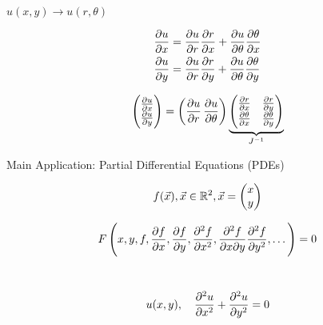 \documentclass[10pt]{scrartcl}
\begin{document}
\begin{example}
	$u(x,y) \longrightarrow u(r,\theta)$
	
	\[
\begin{aligned}
  \frac{\partial u}{\partial x} &= \frac{\partial u}{\partial r}\frac{\partial r}{\partial x} + \frac{\partial u}{\partial \theta} \frac{\partial \theta}{\partial x}\\
  \frac{\partial u}{\partial y} &= \frac{\partial u}{\partial r}\frac{\partial r}{\partial y} + \frac{\partial u}{\partial \theta} \frac{\partial \theta}{\partial y}
\end{aligned}
\]

\[\begin{pmatrix}
\frac{\partial u}{\partial x}\\ \frac{\partial u}{\partial y}
\end{pmatrix}
= \left( \frac{\partial u}{\partial r}\, \frac{\partial u}{\partial \theta}\right)
\underbrace{\begin{pmatrix}
\frac{\partial r}{\partial x} & \frac{\partial r}{\partial y}\\
\frac{\partial \theta}{\partial x} & \frac{\partial \theta}{\partial y}	
\end{pmatrix}}_{J^{-1}}
\]
\end{example}


Main Application: 
Partial Differential Equations (PDEs)

\[f(\vec{x}), \vec{x} \in\mathbb{R}^2, \vec{x} = \begin{pmatrix}
 x \\ y	
 \end{pmatrix}
\]

\[F\left(x,y,f,\frac{\partial f}{\partial x}, \frac{\partial f}{\partial y}, \frac{\partial^2f}{\partial x^2}, \frac{\partial^2f}{\partial x\partial y}\frac{\partial^2f}{\partial y^2},\dots\right) = 0\]~


\[u(x,y),\quad \frac{\partial^2u}{\partial x^2} + \frac{\partial^2u}{\partial y^2} = 0\]
\end{document}
